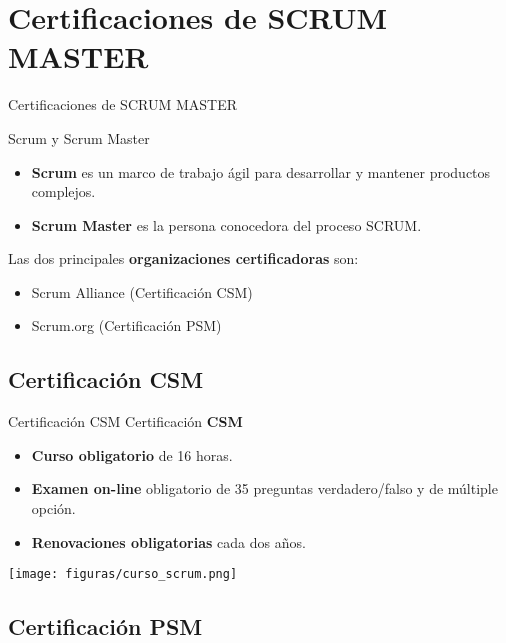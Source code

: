 
\section{Certificaciones de SCRUM MASTER}
\begin{frame}[allowframebreaks]{Certificaciones de SCRUM MASTER}
	
	Scrum y Scrum Master
	
	\begin{itemize}
		\item \textbf{Scrum} es un marco de trabajo ágil para desarrollar y mantener productos complejos.
		\item \textbf{Scrum Master} es la persona conocedora del proceso SCRUM.
	\end{itemize}


	Las dos principales \textbf{organizaciones certificadoras} son:
	\begin{itemize}
		\item Scrum Alliance (Certificación CSM)
		\item Scrum.org (Certificación PSM)
	\end{itemize}

\end{frame}

\subsection{Certificación CSM}

\begin{frame}{Certificación CSM}
	Certificación \textbf{CSM} 
	\begin{itemize}
		\item \textbf{Curso obligatorio} de 16 horas.
		\item \textbf{Examen on-line} obligatorio de 35 preguntas verdadero/falso y de múltiple opción.
		\item \textbf{Renovaciones obligatorias} cada dos años.
	\end{itemize}

	\begin{center}
		\texttt{[image: figuras/curso\_scrum.png]}
	\end{center}

\end{frame}

\subsection{Certificación PSM}

